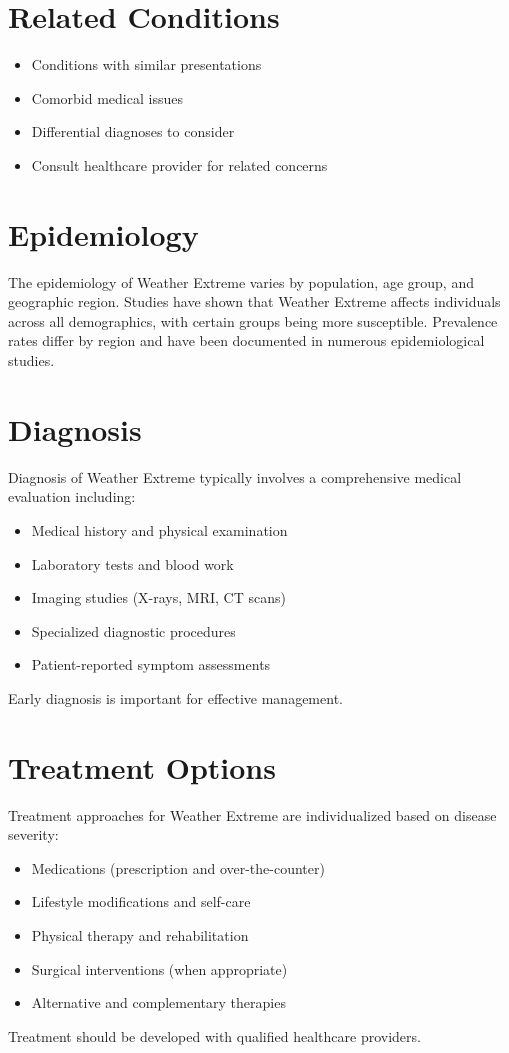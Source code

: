 \section*{Related Conditions}
\begin{itemize}
  \item Conditions with similar presentations
  \item Comorbid medical issues
  \item Differential diagnoses to consider
  \item Consult healthcare provider for related concerns
\end{itemize}

\section*{Epidemiology}
The epidemiology of Weather Extreme varies by population, age group, and geographic region. Studies have shown that Weather Extreme affects individuals across all demographics, with certain groups being more susceptible. Prevalence rates differ by region and have been documented in numerous epidemiological studies.

\section*{Diagnosis}
Diagnosis of Weather Extreme typically involves a comprehensive medical evaluation including:
\begin{itemize}
  \item Medical history and physical examination
  \item Laboratory tests and blood work
  \item Imaging studies (X-rays, MRI, CT scans)
  \item Specialized diagnostic procedures
  \item Patient-reported symptom assessments
\end{itemize}
Early diagnosis is important for effective management.

\section*{Treatment Options}
Treatment approaches for Weather Extreme are individualized based on disease severity:
\begin{itemize}
  \item Medications (prescription and over-the-counter)
  \item Lifestyle modifications and self-care
  \item Physical therapy and rehabilitation
  \item Surgical interventions (when appropriate)
  \item Alternative and complementary therapies
\end{itemize}
Treatment should be developed with qualified healthcare providers.

